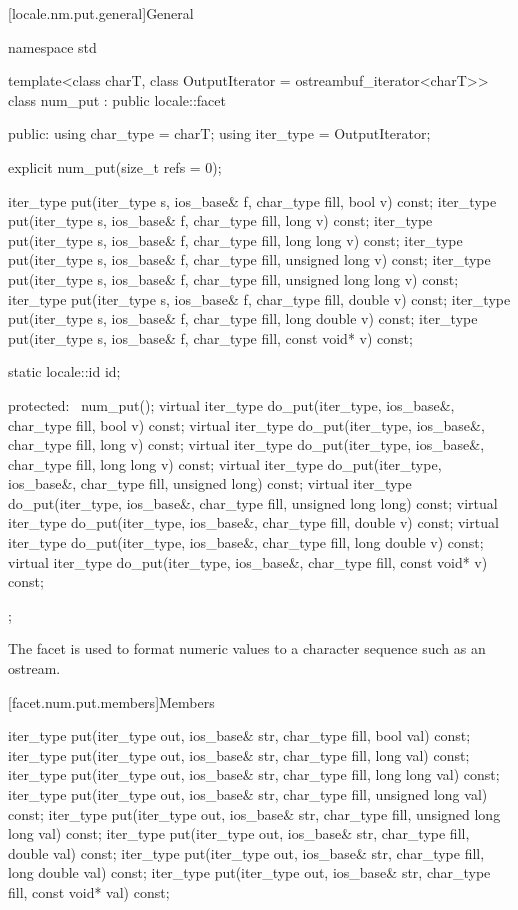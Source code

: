 [locale.nm.put.general]{General}

%
\begin{codeblock}
namespace std {
  template<class charT, class OutputIterator = ostreambuf_iterator<charT>>
    class num_put : public locale::facet {
    public:
      using char_type = charT;
      using iter_type = OutputIterator;

      explicit num_put(size_t refs = 0);

      iter_type put(iter_type s, ios_base& f, char_type fill, bool v) const;
      iter_type put(iter_type s, ios_base& f, char_type fill, long v) const;
      iter_type put(iter_type s, ios_base& f, char_type fill, long long v) const;
      iter_type put(iter_type s, ios_base& f, char_type fill, unsigned long v) const;
      iter_type put(iter_type s, ios_base& f, char_type fill, unsigned long long v) const;
      iter_type put(iter_type s, ios_base& f, char_type fill, double v) const;
      iter_type put(iter_type s, ios_base& f, char_type fill, long double v) const;
      iter_type put(iter_type s, ios_base& f, char_type fill, const void* v) const;

      static locale::id id;

    protected:
      ~num_put();
      virtual iter_type do_put(iter_type, ios_base&, char_type fill, bool v) const;
      virtual iter_type do_put(iter_type, ios_base&, char_type fill, long v) const;
      virtual iter_type do_put(iter_type, ios_base&, char_type fill, long long v) const;
      virtual iter_type do_put(iter_type, ios_base&, char_type fill, unsigned long) const;
      virtual iter_type do_put(iter_type, ios_base&, char_type fill, unsigned long long) const;
      virtual iter_type do_put(iter_type, ios_base&, char_type fill, double v) const;
      virtual iter_type do_put(iter_type, ios_base&, char_type fill, long double v) const;
      virtual iter_type do_put(iter_type, ios_base&, char_type fill, const void* v) const;
    };
}
\end{codeblock}

\pnum
The facet
is used to format numeric values to a character sequence such as an ostream.

[facet.num.put.members]{Members}

%
\begin{itemdecl}
iter_type put(iter_type out, ios_base& str, char_type fill, bool val) const;
iter_type put(iter_type out, ios_base& str, char_type fill, long val) const;
iter_type put(iter_type out, ios_base& str, char_type fill, long long val) const;
iter_type put(iter_type out, ios_base& str, char_type fill, unsigned long val) const;
iter_type put(iter_type out, ios_base& str, char_type fill, unsigned long long val) const;
iter_type put(iter_type out, ios_base& str, char_type fill, double val) const;
iter_type put(iter_type out, ios_base& str, char_type fill, long double val) const;
iter_type put(iter_type out, ios_base& str, char_type fill, const void* val) const;
\end{itemdecl}

